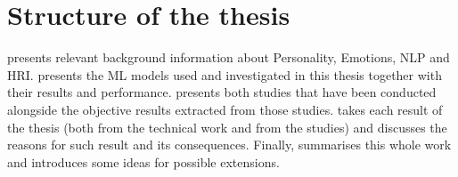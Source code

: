 \documentclass[nomenclature, english, biblatex]{kththesis}
\begin{document}






\section{Structure of the thesis}
 presents relevant background information about Personality, Emotions, \gls{NLP} and \gls{HRI}.  presents the \gls{ML} models used and investigated in this thesis together with their results and performance.  presents both studies that have been conducted alongside the objective results extracted from those studies.  takes each result of the thesis (both from the technical work and from the studies) and discusses the reasons for such result and its consequences. Finally,  summarises this whole work and introduces some ideas for possible extensions.
\end{document}
